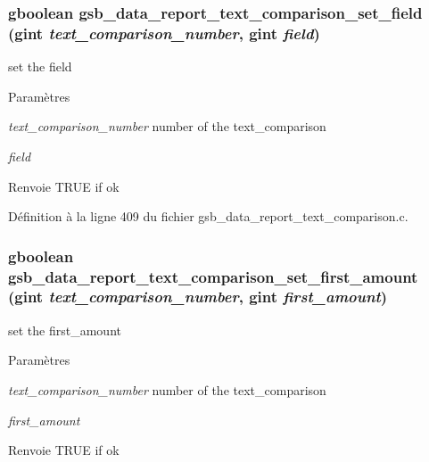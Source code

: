 \subsubsection[{gsb\_\-data\_\-report\_\-text\_\-comparison\_\-set\_\-field}]{\setlength{\rightskip}{0pt plus 5cm}gboolean gsb\_\-data\_\-report\_\-text\_\-comparison\_\-set\_\-field (gint {\em text\_\-comparison\_\-number}, \/  gint {\em field})}\label{gsb__data__report__text__comparison_8h_aa1130b73bb1c2a7ddfa74a2942f6a159}
set the field


\begin{DoxyParams}{Paramètres}
\item[{\em text\_\-comparison\_\-number}]number of the text\_\-comparison \item[{\em field}]\end{DoxyParams}
\begin{DoxyReturn}{Renvoie}
TRUE if ok 
\end{DoxyReturn}


Définition à la ligne 409 du fichier gsb\_\-data\_\-report\_\-text\_\-comparison.c.

\subsubsection[{gsb\_\-data\_\-report\_\-text\_\-comparison\_\-set\_\-first\_\-amount}]{\setlength{\rightskip}{0pt plus 5cm}gboolean gsb\_\-data\_\-report\_\-text\_\-comparison\_\-set\_\-first\_\-amount (gint {\em text\_\-comparison\_\-number}, \/  gint {\em first\_\-amount})}\label{gsb__data__report__text__comparison_8h_a76926aaf68882b238b0555f7cdb26ffc}
set the first\_\-amount


\begin{DoxyParams}{Paramètres}
\item[{\em text\_\-comparison\_\-number}]number of the text\_\-comparison \item[{\em first\_\-amount}]\end{DoxyParams}
\begin{DoxyReturn}{Renvoie}
TRUE if ok 
\end{DoxyReturn}


